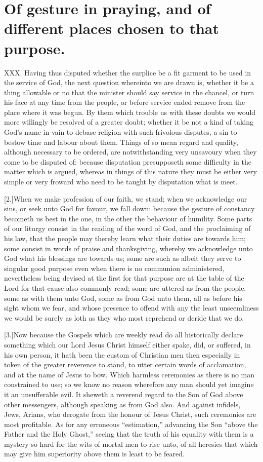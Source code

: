 \section*{Of gesture in praying, and of different places chosen to that purpose.}
XXX. Having thus disputed whether the surplice be a fit garment to be used in the service of God, the next question whereinto we are drawn is, whether it be a thing allowable or no that the minister should say service in the chancel, or turn his face at any time from the people, or before service ended remove from the place where it was begun. By them which trouble us with these doubts we would more willingly be resolved of a greater doubt; whether it be not a kind of taking God’s name in vain to debase religion with such frivolous disputes, a sin to bestow time and labour about them. Things of so mean regard and quality, although necessary to be ordered, are notwithstanding very unsavoury when they come to be disputed of: because disputation presupposeth some difficulty in the matter which is argued, whereas in things of this nature they must be either very simple or very froward who need to be taught by disputation what is meet.

[2.]When we make profession of our faith, we stand; when we acknowledge our sins, or seek unto God for favour, we fall down: because the gesture of constancy becometh us best in the one, in the other the behaviour of humility. Some parts of our liturgy consist in the reading of the word of God,  and the proclaiming of his law, that the people may thereby learn what their duties are towards him;
 some consist in words of praise and thanksgiving, whereby we acknowledge unto God what his blessings are towards us; some are such as albeit they serve to singular good purpose even when there is no communion administered, nevertheless being devised at the first for that purpose are at the table of the Lord for that cause also commonly read; some are uttered as from the people, some as with them unto God, some as from God unto them, all as before his sight whom we fear, and whose presence to offend with any the least unseemliness we would be surely as loth as they who most reprehend or deride that we do.

[3.]Now because the Gospels which are weekly read do all historically declare something which our Lord Jesus Christ himself either spake, did, or suffered, in his own person, it hath been the custom of Christian men then especially in token of the greater reverence to stand, to utter certain words of acclamation, and at the name of Jesus to bow. Which harmless ceremonies as there is no  man constrained to use; so we know no reason wherefore any man should yet imagine it an unsufferable evil.
 It sheweth a reverend regard to the Son of God above other messengers, although speaking as from God also. And against infidels, Jews, Arians, who derogate from the honour of Jesus Christ, such ceremonies are most profitable. As for any erroneous “estimation,” advancing the Son “above the Father and the Holy Ghost,” seeing that the truth of his equality with them is a mystery so hard for the wits of mortal men to rise unto, of all heresies that which may give him superiority above them is least to be feared.

